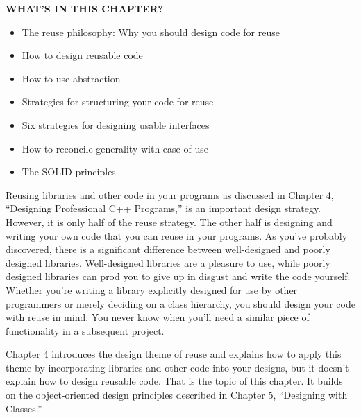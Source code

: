 \noindent
\textbf{WHAT’S IN THIS CHAPTER?}

\begin{itemize}
\item
The reuse philosophy: Why you should design code for reuse

\item
How to design reusable code

\item
How to use abstraction

\item
Strategies for structuring your code for reuse

\item
Six strategies for designing usable interfaces

\item
How to reconcile generality with ease of use

\item
The SOLID principles
\end{itemize}

Reusing libraries and other code in your programs as discussed in Chapter 4, “Designing Professional C++ Programs,” is an important design strategy. However, it is only half of the reuse strategy. The other half is designing and writing your own code that you can reuse in your programs. As you’ve probably discovered, there is a significant difference between well-designed and poorly designed libraries. Well-designed libraries are a pleasure to use, while poorly designed libraries can prod you to give up in disgust and write the code yourself. Whether you’re writing a library explicitly designed for use by other programmers or merely deciding on a class hierarchy, you should design your code with reuse in mind. You never know when you’ll need a similar piece of functionality in a subsequent project.

Chapter 4 introduces the design theme of reuse and explains how to apply this theme by incorporating libraries and other code into your designs, but it doesn’t explain how to design reusable code. That is the topic of this chapter. It builds on the object-oriented design principles described in Chapter 5, “Designing with Classes.”
